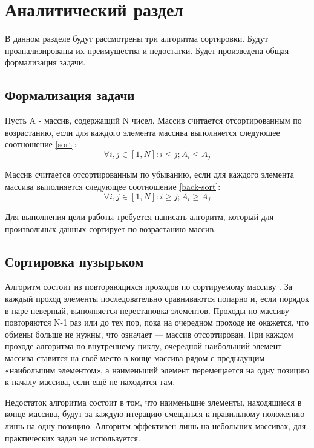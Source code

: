 \chapter{Аналитический раздел}
В данном разделе будут рассмотрены три алгоритма сортировки.
Будут проанализированы их преимущества и недостатки.
Будет произведена общая формализация задачи.

\section{Формализация задачи}
Пусть A - массив, содержащий N чисел.
Массив считается отсортированным по возрастанию, если для каждого элемента массива выполняется следующее соотношение \ref{sort}:
\begin{equation}
	\label{sort}
		\forall i, j   \in [1, N] : i  \leq  j ; A_i \leq A_j 
\end{equation}

Массив считается отсортированным по убыванию, если для каждого элемента массива выполняется следующее соотношение \ref{back-sort}:
\begin{equation}
	\label{back-sort}
		\forall i, j   \in [1, N] : i  \geq  j ; A_i \geq A_j 
\end{equation}

Для выполнения цели работы требуется написать алгоритм, который для произвольных данных сортирует по возрастанию массив.

\section{Сортировка пузырьком}
Алгоритм состоит из повторяющихся проходов по сортируемому массиву \cite{bubble}. 
За каждый проход элементы последовательно сравниваются попарно и, если порядок в паре неверный, выполняется перестановка элементов. 
Проходы по массиву повторяются N-1 раз или до тех пор, пока на очередном проходе не окажется, что обмены больше не нужны, что означает — массив отсортирован. 
При каждом проходе алгоритма по внутреннему циклу, очередной наибольший элемент массива ставится на своё место в конце массива рядом с предыдущим «наибольшим элементом», а наименьший элемент перемещается на одну позицию к началу массива, если ещё не находится там.

Недостаток алгоритма состоит в том, что наименьшие элементы, находящиеся в конце массива, будут за каждую итерацию смещаться к правильному положению лишь на одну позицию.
Алгоритм эффективен лишь на небольших массивах, для практических задач не используется.

